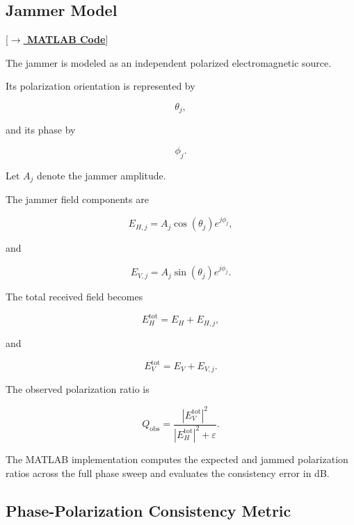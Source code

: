 \documentclass{article}
\begin{document}
\subsection{Jammer Model} [\hyperref[lst:poljammed]{\textbf{$\rightarrow$ MATLAB Code}}]

The jammer is modeled as an independent polarized electromagnetic source.

Its polarization orientation is represented by

\begin{equation}
\theta_j,
\end{equation}

and its phase by

\begin{equation}
\phi_j.
\end{equation}

Let $A_j$ denote the jammer amplitude.

The jammer field components are

\begin{equation}
E_{H,j}=
A_j\cos(\theta_j)e^{j\phi_j},
\end{equation}

and

\begin{equation}
E_{V,j}=
A_j\sin(\theta_j)e^{j\phi_j}.
\end{equation}

The total received field becomes

\begin{equation}
E_H^{\mathrm{tot}}=
E_H+E_{H,j},
\end{equation}

and

\begin{equation}
E_V^{\mathrm{tot}}=
E_V+E_{V,j}.
\end{equation}

The observed polarization ratio is

\begin{equation}
Q_{\mathrm{obs}}=
\frac{|E_V^{\mathrm{tot}}|^2}
{|E_H^{\mathrm{tot}}|^2+\varepsilon}.
\end{equation}

The MATLAB implementation computes the expected and jammed polarization ratios across the full phase sweep and evaluates the consistency error in dB.

\subsection{Phase-Polarization Consistency Metric}
\end{document}
